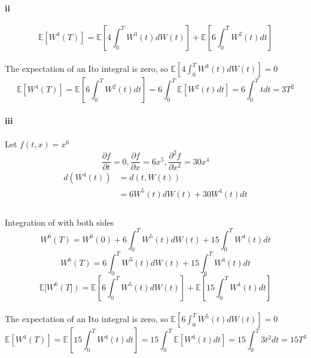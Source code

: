 \documentclass{article}
\begin{document}
\paragraph{ii}
\begin{displaymath}
  \mathbb{E} [W^4(T)]=\mathbb{E}[4\int_{0}^{T}W^3(t)dW(t)]+\mathbb{E}[6\int_{0}^{T}W^2(t)dt]
\end{displaymath}
\paragraph{}{The expectation of an Ito integral is zero, so $\mathbb{E}[4\int_{0}^{T}W^3(t)dW(t)]=0$}
\begin{displaymath}
   \mathbb{E} [W^4(T)]=\mathbb{E}[6\int_{0}^{T}W^2(t)dt]=6\int_{0}^{T}\mathbb{E}[W^2(t)dt]=6\int_{0}^{T}tdt=3T^2
\end{displaymath}
\paragraph{iii}
\paragraph{}{Let $f(t,x)=x^6$}
\begin{displaymath}
 \frac{\partial f}{\partial t}=0,\frac{\partial f}{\partial x}=6x^5,\frac{\partial^2 f}{\partial x^2}=30x^4
\end{displaymath}
\begin{align*}
  d(W^4(t)) & = d(t,W(t))\\
   & =6W^5(t)dW(t)+30W^4(t)dt \\
\end{align*}
\paragraph{}{Integration of with both sides}
\begin{displaymath}
  W^6(T)=W^6(0)+6\int_{0}^{T}W^5(t)dW(t)+15\int_{0}^{T}W^4(t)dt
\end{displaymath}
\begin{displaymath}
  W^6(T)=6\int_{0}^{T}W^5(t)dW(t)+15\int_{0}^{T}W^4(t)dt
\end{displaymath}
\begin{displaymath}
  \mathbb{E} [W^6(T])= \mathbb{E}[6\int_{0}^{T}W^5(t)dW(t)]+ \mathbb{E}[15\int_{0}^{T}W^4(t)dt]
\end{displaymath}
\paragraph{}{The expectation of an Ito integral is zero, so $\mathbb{E}[6\int_{0}^{T}W^5(t)dW(t)]=0$}
\begin{displaymath}
   \mathbb{E} [W^4(T)]=\mathbb{E}[15\int_{0}^{T}W^4(t)dt]=15\int_{0}^{T}\mathbb{E}[W^4(t)dt]=15\int_{0}^{T}3t^2dt=15T^3
\end{displaymath}
\end{document}
